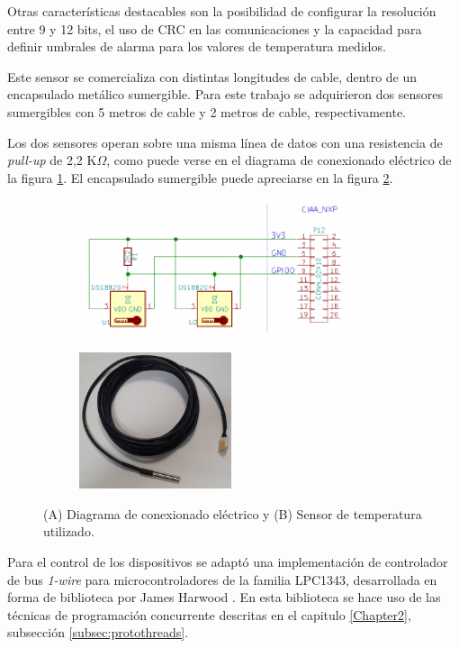 Otras características destacables son la posibilidad de configurar la resolución entre 9 y 12 bits, el uso de CRC en las comunicaciones y la capacidad para definir umbrales de alarma para los valores de temperatura medidos.

Este sensor se comercializa con distintas longitudes de cable, dentro de un encapsulado metálico sumergible.  Para este trabajo se adquirieron dos sensores sumergibles con 5 metros de cable y 2 metros de cable, respectivamente.   

Los dos sensores operan sobre una misma línea de datos con una resistencia de \textit{pull-up} de 2,2 K$\Omega$, como puede verse en el diagrama de conexionado eléctrico de la figura \ref{fig:ds18b20_conexionado}.  El encapsulado sumergible puede apreciarse en la figura \ref{fig:termometro}.

\vspace{10px}

\begin{figure}[ht]
	\centering
	\begin{subfigure}{.6\textwidth}
		\centering
		\includegraphics[height=4cm]{./Figures/ds18b20_conexionado.pdf}
		\caption{ }
  		\label{fig:ds18b20_conexionado}
	\end{subfigure}%
	\begin{subfigure}{.4\textwidth}
		\centering
		\includegraphics[height=4cm]{./Figures/ds18b20.jpg}
		\caption{ }
		\label{fig:termometro}
	\end{subfigure}
	\caption{(A) Diagrama de conexionado eléctrico y (B) Sensor de temperatura utilizado.}
	\label{fig:ds18b20}
\end{figure}

Para el control de los dispositivos se adaptó una implementación de controlador de bus \textit{1-wire} para microcontroladores de la familia LPC1343, desarrollada en forma de biblioteca por James Harwood \citep{harwood}.  En esta biblioteca se hace uso de las técnicas de programación concurrente descritas en el capitulo \ref{Chapter2}, subsección \ref{subsec:protothreads}.

